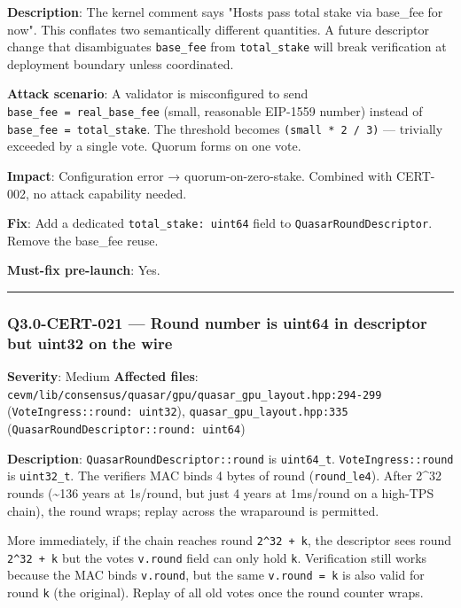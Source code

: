 \documentclass[
]{article}
\begin{document}
\textbf{Description}: The kernel comment says "Hosts pass total stake
via base\_fee for now". This conflates two semantically different
quantities. A future descriptor change that disambiguates
\texttt{base\_fee} from \texttt{total\_stake} will break verification at
deployment boundary unless coordinated.

\textbf{Attack scenario}: A validator is misconfigured to send
\texttt{base\_fee\ =\ real\_base\_fee} (small, reasonable EIP-1559
number) instead of \texttt{base\_fee\ =\ total\_stake}. The threshold
becomes \texttt{(small\ *\ 2\ /\ 3)} --- trivially exceeded by a single
vote. Quorum forms on one vote.

\textbf{Impact}: Configuration error → quorum-on-zero-stake. Combined
with CERT-002, no attack capability needed.

\textbf{Fix}: Add a dedicated \texttt{total\_stake:\ uint64} field to
\texttt{QuasarRoundDescriptor}. Remove the base\_fee reuse.

\textbf{Must-fix pre-launch}: Yes.

\begin{center}\rule{0.5\linewidth}{0.5pt}\end{center}

\subsubsection{Q3.0-CERT-021 --- Round number is uint64 in descriptor
but uint32 on the
wire}\label{q30-cert-021--round-number-is-uint64-in-descriptor-but-uint32-on-the-wire}

\textbf{Severity}: Medium \textbf{Affected files}:
\texttt{cevm/lib/consensus/quasar/gpu/quasar\_gpu\_layout.hpp:294-299}
(\texttt{VoteIngress::round:\ uint32}),
\texttt{quasar\_gpu\_layout.hpp:335}
(\texttt{QuasarRoundDescriptor::round:\ uint64})

\textbf{Description}: \texttt{QuasarRoundDescriptor::round} is
\texttt{uint64\_t}. \texttt{VoteIngress::round} is \texttt{uint32\_t}.
The verifier\textquotesingle s MAC binds 4 bytes of round
(\texttt{round\_le4}). After 2\^{}32 rounds (\textasciitilde136 years at
1s/round, but just 4 years at 1ms/round on a high-TPS chain), the round
wraps; replay across the wraparound is permitted.

More immediately, if the chain reaches round \texttt{2\^{}32\ +\ k}, the
descriptor sees round \texttt{2\^{}32\ +\ k} but the
vote\textquotesingle s \texttt{v.round} field can only hold \texttt{k}.
Verification still works because the MAC binds \texttt{v.round}, but the
same \texttt{v.round\ =\ k} is also valid for round \texttt{k} (the
original). Replay of all old votes once the round counter wraps.
\end{document}
